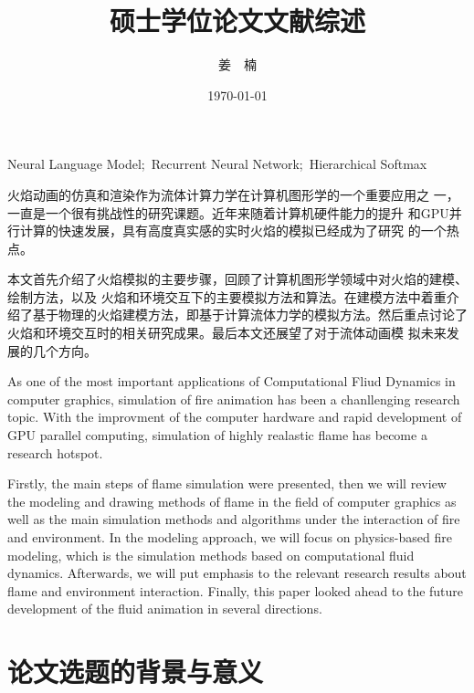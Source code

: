 \documentclass[12pt,a4paper]{article}
\title{硕士学位论文文献综述}
\author{姜~~楠}
\date{\today}
\begin{document}
\maketitle



{Neural Language Model;\ Recurrent Neural Network;\ Hierarchical Softmax}

\begin{abstract_ch}
  火焰动画的仿真和渲染作为流体计算力学在计算机图形学的一个重要应用之
  一，一直是一个很有挑战性的研究课题。近年来随着计算机硬件能力的提升
  和GPU并行计算的快速发展，具有高度真实感的实时火焰的模拟已经成为了研究
  的一个热点。

  本文首先介绍了火焰模拟的主要步骤，回顾了计算机图形学领域中对火焰的建模、绘制方法，以及
  火焰和环境交互下的主要模拟方法和算法。在建模方法中着重介绍了基于物理的火焰建模方法，即基于计算流体力学的模拟方法。然后重点讨论了火焰和环境交互时的相关研究成果。最后本文还展望了对于流体动画模
  拟未来发展的几个方向。
\end{abstract_ch}
\newpage
\begin{abstract_en}
  As one of the most important applications of Computational Fliud
  Dynamics in computer graphics, simulation of fire animation has been
  a chanllenging research topic. With the improvment of the computer
  hardware and rapid development of GPU parallel computing, simulation
  of highly realastic flame has become a research hotspot.


 Firstly, the main steps of flame simulation were presented, then we
will review the modeling and drawing methods of flame in the field of
computer graphics as well as the main simulation methods and
algorithms under the interaction of fire and environment. In the
modeling approach, we will focus on physics-based fire modeling, which
is the simulation methods based on computational fluid dynamics.
Afterwards, we will put emphasis to the relevant research results
about flame and environment interaction. Finally, this paper looked
ahead to the future development of the fluid animation in several
directions.

\end{abstract_en}
\newpage
\tableofcontents
\newpage

\section{论文选题的背景与意义}
\end{document}
